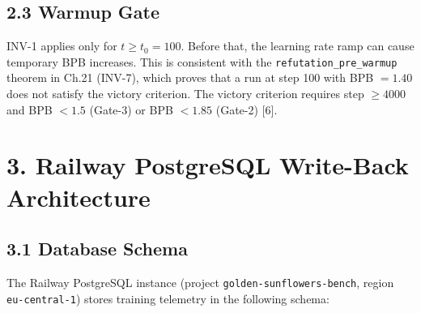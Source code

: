 \subsection{2.3 Warmup Gate}\label{fa_15:warmup-gate}

INV-1 applies only for \(t \geq t_0 = 100\).
Before that, the learning rate ramp can cause
temporary BPB increases. This is consistent with
the \texttt{refutation\_pre\_warmup} theorem in
Ch.21 (INV-7), which proves that a run at step 100
with BPB \(= 1.40\) does not satisfy the victory
criterion. The victory criterion requires step
\(\geq 4000\) and BPB \(< 1.5\) (Gate-3) or BPB
\(< 1.85\) (Gate-2) [6].

\section{3. Railway PostgreSQL Write-Back
Architecture}\label{fa_15:railway-write-back-architecture}

\subsection{3.1 Database
Schema}\label{fa_15:database-schema}

The Railway PostgreSQL instance (project
\texttt{golden-sunflowers-bench}, region
\texttt{eu-central-1}) stores training telemetry
in the following schema:

\begin{Shaded}
\begin{Highlighting}[]
 
 \NormalTok{,}
    \NormalTok{ (}\NormalTok{, }\NormalTok{, }\NormalTok{, }\NormalTok{)),}
  \NormalTok{,}
     \NormalTok{,}
     \NormalTok{,}
 \NormalTok{,}
 \NormalTok{,}
\NormalTok{);}
 
 
\end{Highlighting}
\end{Shaded}

